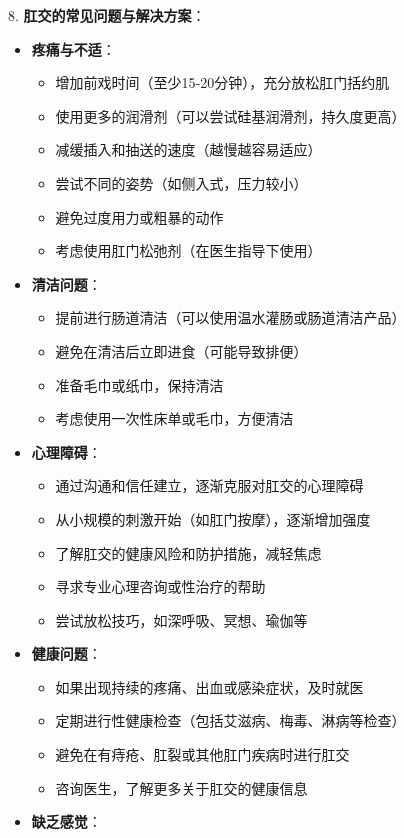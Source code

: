 \documentclass[12pt,UTF8]{ctexbook}
\begin{document}
8. \textbf{肛交的常见问题与解决方案}：
\begin{itemize}
	\item \textbf{疼痛与不适}：
	\begin{itemize}
		\item 增加前戏时间（至少15-20分钟），充分放松肛门括约肌
		\item 使用更多的润滑剂（可以尝试硅基润滑剂，持久度更高）
		\item 减缓插入和抽送的速度（越慢越容易适应）
		\item 尝试不同的姿势（如侧入式，压力较小）
		\item 避免过度用力或粗暴的动作
		\item 考虑使用肛门松弛剂（在医生指导下使用）
	\end{itemize}
	\item \textbf{清洁问题}：
	\begin{itemize}
		\item 提前进行肠道清洁（可以使用温水灌肠或肠道清洁产品）
		\item 避免在清洁后立即进食（可能导致排便）
		\item 准备毛巾或纸巾，保持清洁
		\item 考虑使用一次性床单或毛巾，方便清洁
	\end{itemize}
	\item \textbf{心理障碍}：
	\begin{itemize}
		\item 通过沟通和信任建立，逐渐克服对肛交的心理障碍
		\item 从小规模的刺激开始（如肛门按摩），逐渐增加强度
		\item 了解肛交的健康风险和防护措施，减轻焦虑
		\item 寻求专业心理咨询或性治疗的帮助
		\item 尝试放松技巧，如深呼吸、冥想、瑜伽等
	\end{itemize}
	\item \textbf{健康问题}：
	\begin{itemize}
		\item 如果出现持续的疼痛、出血或感染症状，及时就医
		\item 定期进行性健康检查（包括艾滋病、梅毒、淋病等检查）
		\item 避免在有痔疮、肛裂或其他肛门疾病时进行肛交
		\item 咨询医生，了解更多关于肛交的健康信息
	\end{itemize}
	\item \textbf{缺乏感觉}：
	\begin{itemize}

\end{itemize}
\end{itemize}
\end{document}
